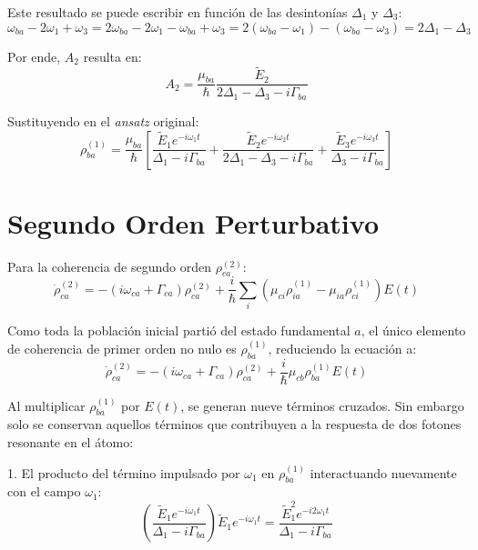 \documentclass[12pt,a4paper]{article}
\begin{document}
Este resultado se puede escribir en función de las desintonías $\Delta_1$ y $\Delta_3$:
\begin{equation}
\omega_{ba} - 2\omega_1 + \omega_3 = 2\omega_{ba} - 2\omega_1 - \omega_{ba} + \omega_3 = 2(\omega_{ba} - \omega_1) - (\omega_{ba} - \omega_3) = 2\Delta_1 - \Delta_3
\end{equation}

Por ende, $A_2$ resulta en:
\begin{equation}
A_2 = \frac{\mu_{ba}}{\hbar} \frac{\tilde{E}_2}{2\Delta_1 - \Delta_3 - i\Gamma_{ba}}
\end{equation}

Sustituyendo en el \textit{ansatz} original:
\begin{equation}
\rho_{ba}^{(1)} = \frac{\mu_{ba}}{\hbar} \left[ \frac{\tilde{E}_1 e^{-i\omega_1 t}}{\Delta_1 - i\Gamma_{ba}} + \frac{\tilde{E}_2 e^{-i\omega_2 t}}{2\Delta_1 - \Delta_3 - i\Gamma_{ba}} + \frac{\tilde{E}_3 e^{-i\omega_3 t}}{\Delta_3 - i\Gamma_{ba}} \right]
\end{equation}
 
\section{Segundo Orden Perturbativo}

Para la coherencia de segundo orden $\rho_{ca}^{(2)}$:
\begin{equation}
\dot{\rho}_{ca}^{(2)} = -(i\omega_{ca} + \Gamma_{ca})\rho_{ca}^{(2)} + \frac{i}{\hbar} \sum_{i} (\mu_{ci}\rho_{ia}^{(1)} - \mu_{ia}\rho_{ci}^{(1)})E(t)
\end{equation}

Como toda la población inicial partió del estado fundamental $a$, el único elemento de coherencia de primer orden no nulo es $\rho_{ba}^{(1)}$, reduciendo la ecuación a:
\begin{equation}
\dot{\rho}_{ca}^{(2)} = -(i\omega_{ca} + \Gamma_{ca})\rho_{ca}^{(2)} + \frac{i}{\hbar} \mu_{cb} \rho_{ba}^{(1)} E(t)
\end{equation}

Al multiplicar $\rho_{ba}^{(1)}$ por $E(t)$, se generan nueve términos cruzados. Sin embargo solo se conservan aquellos términos que contribuyen a la respuesta de dos fotones resonante en el átomo:

1. El producto del término impulsado por $\omega_1$ en $\rho_{ba}^{(1)}$ interactuando nuevamente con el campo $\omega_1$:
\begin{equation}
\left( \frac{\tilde{E}_1 e^{-i\omega_1 t}}{\Delta_1 - i\Gamma_{ba}} \right) \tilde{E}_1 e^{-i\omega_1 t} = \frac{\tilde{E}_1^2 e^{-i2\omega_1 t}}{\Delta_1 - i\Gamma_{ba}}
\end{equation}
\end{document}
